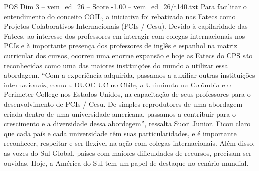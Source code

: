 \begin{textsample}{POS Dim 3 – vem\_ed\_26 – Score -1.00 – vem\_ed\_26/t140.txt}
Para facilitar o entendimento do conceito COIL, a iniciativa foi rebatizada nas Fatecs como Projetos Colaborativos Internacionais (PCIs / Cesu).
Devido à capilaridade das Fatecs, ao interesse dos professores em interagir com colegas internacionais nos PCIs e à importante presença dos professores de inglês e espanhol na matriz curricular dos cursos, ocorreu uma enorme expansão e hoje as Fatecs do CPS são reconhecidas como uma das maiores instituições do mundo a utilizar essa abordagem. “Com a experiência adquirida, passamos a auxiliar outras instituições internacionais, como a DUOC UC no Chile, a Uniminuto na Colômbia e o Perimeter College nos Estados Unidos, na capacitação de seus professores para o desenvolvimento de PCIs / Cesu.
De simples reprodutores de uma abordagem criada dentro de uma universidade americana, passamos a contribuir para o crescimento e a diversidade dessa abordagem”, ressalta Succi Junior.
Ficou claro que cada país e cada universidade têm suas particularidades, e é importante reconhecer, respeitar e ser flexível na ação com colegas internacionais.
Além disso, as vozes do Sul Global, países com maiores dificuldades de recursos, precisam ser ouvidas.
Hoje, a América do Sul tem um papel de destaque no cenário mundial.

\end{textsample}
